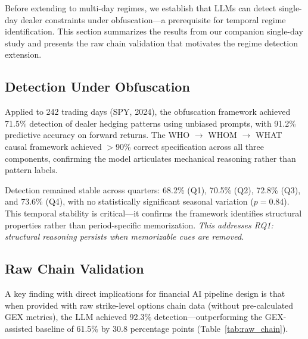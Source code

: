 \documentclass[jrfm,article,accept,moreauthors,pdftex]{Definitions/mdpi}
\begin{document}
Before extending to multi-day regimes, we establish that LLMs can detect single-day dealer constraints under obfuscation---a prerequisite for temporal regime identification. This section summarizes the results from our companion single-day study \citep{regan2025obfuscation} and presents the raw chain validation that motivates the regime detection extension.

\subsection{Detection Under Obfuscation}

Applied to 242 trading days {(SPY, 2024)}, %
 the obfuscation framework achieved 71.5\% detection of dealer hedging patterns using unbiased prompts, with 91.2\% predictive accuracy on forward returns. The WHO $\rightarrow$ WHOM $\rightarrow$ WHAT causal framework achieved $>$90\% correct specification across all three components, confirming the model articulates mechanical reasoning rather than pattern labels.

Detection remained stable across quarters: 68.2\% (Q1), 70.5\% (Q2), 72.8\% (Q3), and 73.6\% (Q4), with no statistically significant seasonal variation ($p = 0.84$). This temporal stability is critical---it confirms the framework identifies structural properties rather than period-specific memorization. \textit{This addresses RQ1: structural reasoning persists when memorizable cues are removed.}

\subsection{Raw Chain Validation}
\label{subsec:raw_chain}

A key finding with direct implications for financial AI pipeline design is that when provided with raw strike-level options chain data (without pre-calculated GEX metrics), the LLM achieved 92.3\% detection---outperforming the GEX-assisted baseline of 61.5\% by 30.8 percentage points (Table~\ref{tab:raw_chain}).

\end{document}
